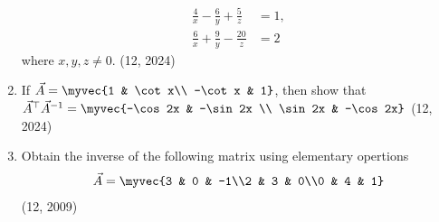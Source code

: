 \begin{enumerate}[label=\thesubsection.\arabic*,ref=\thesubsection.\theenumi]
\begin{align*}
		\frac{4}{x} - \frac{6}{y}  + \frac{5}{z} &=1, 
		\\
		\frac{6}{x} + \frac{9}{y} - \frac{20}{z} &= 2 
\end{align*}
where $x,y,z \neq 0$.
\hfill (12, 2024)
	\item If $\vec{A}= \myvec{1 & \cot x\\ -\cot x & 1}$, then show that $\vec{A}^{\top}\vec{A}^{-1}= \myvec{-\cos 2x & -\sin 2x \\ \sin 2x & -\cos 2x}$
\hfill (12, 2024)
	\item Obtain the inverse of the following matrix using elementary opertions
\begin{align*}
		\vec{A} = \myvec{3 & 0 & -1\\2 & 3 & 0\\0 & 4 & 1}
\end{align*}
\hfill	(12, 2009)
																	    
\end{enumerate}
